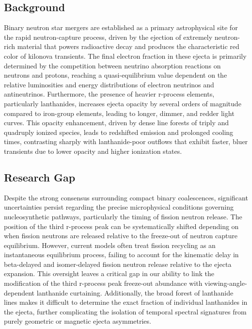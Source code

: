 \documentclass[conference]{IEEEtran}
\begin{document}
\subsection{Background}
Binary neutron star mergers are established as a primary astrophysical site for the rapid neutron-capture process, driven by the ejection of extremely neutron-rich material that powers radioactive decay and produces the characteristic red color of kilonova transients. The final electron fraction in these ejecta is primarily determined by the competition between neutrino absorption reactions on neutrons and protons, reaching a quasi-equilibrium value dependent on the relative luminosities and energy distributions of electron neutrinos and antineutrinos. Furthermore, the presence of heavier r-process elements, particularly lanthanides, increases ejecta opacity by several orders of magnitude compared to iron-group elements, leading to longer, dimmer, and redder light curves. This opacity enhancement, driven by dense line forests of triply and quadruply ionized species, leads to redshifted emission and prolonged cooling times, contrasting sharply with lanthanide-poor outflows that exhibit faster, bluer transients due to lower opacity and higher ionization states.~\cite{cite_30c88fe46f23448d,cite_612290131318c0d4,cite_c5afe6a1f3d54206,cite_bbb76a303fab42b5}

\subsection{Research Gap}
Despite the strong consensus surrounding compact binary coalescences, significant uncertainties persist regarding the precise microphysical conditions governing nucleosynthetic pathways, particularly the timing of fission neutron release. The position of the third r-process peak can be systematically shifted depending on when fission neutrons are released relative to the freeze-out of neutron capture equilibrium. However, current models often treat fission recycling as an instantaneous equilibrium process, failing to account for the kinematic delay in beta-delayed and isomer-delayed fission neutron release relative to the ejecta expansion. This oversight leaves a critical gap in our ability to link the modification of the third r-process peak freeze-out abundance with viewing-angle-dependent lanthanide curtaining. Additionally, the broad forest of lanthanide lines makes it difficult to determine the exact fraction of individual lanthanides in the ejecta, further complicating the isolation of temporal spectral signatures from purely geometric or magnetic ejecta asymmetries.~\cite{cite_2e146bff5b4a005e,cite_b89745a07eed477d}
\end{document}
